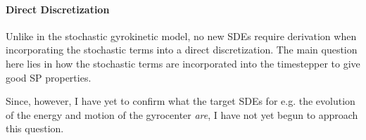 \paragraph*{Direct Discretization}
    \begin{remark}
        Unlike in the stochastic gyrokinetic model, no new SDEs require derivation when incorporating the stochastic terms into a direct discretization. The main question here lies in how the stochastic terms are incorporated into the timestepper to give good SP properties.
        
        Since, however, I have yet to confirm what the target SDEs for e.g. the evolution of the energy and motion of the gyrocenter \emph{are}, I have not yet begun to approach this question.
    \end{remark}

  
